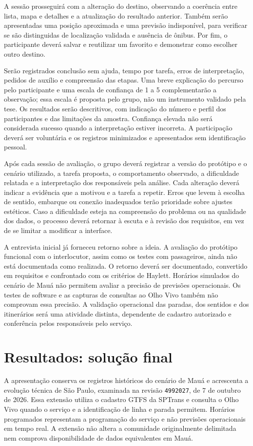 \documentclass[12pt,oneside,a4paper,brazil,chapter=TITLE]{abntex2}
\begin{document}
A sessão prosseguirá com a alteração do destino, observando a coerência entre lista, mapa e detalhes e a atualização do resultado anterior. Também serão apresentadas uma posição aproximada e uma previsão indisponível, para verificar se são distinguidas de localização validada e ausência de ônibus. Por fim, o participante deverá salvar e reutilizar um favorito e demonstrar como escolher outro destino.

Serão registrados conclusão sem ajuda, tempo por tarefa, erros de interpretação, pedidos de auxílio e compreensão das etapas. Uma breve explicação do percurso pelo participante e uma escala de confiança de 1 a 5 complementarão a observação; essa escala é proposta pelo grupo, não um instrumento validado pela tese. Os resultados serão descritivos, com indicação do número e perfil dos participantes e das limitações da amostra. Confiança elevada não será considerada sucesso quando a interpretação estiver incorreta. A participação deverá ser voluntária e os registros minimizados e apresentados sem identificação pessoal.

Após cada sessão de avaliação, o grupo deverá registrar a versão do protótipo e o cenário utilizado, a tarefa proposta, o comportamento observado, a dificuldade relatada e a interpretação dos responsáveis pela análise. Cada alteração deverá indicar a evidência que a motivou e a tarefa a repetir. Erros que levem à escolha de sentido, embarque ou conexão inadequados terão prioridade sobre ajustes estéticos. Caso a dificuldade esteja na compreensão do problema ou na qualidade dos dados, o processo deverá retornar à escuta e à revisão dos requisitos, em vez de se limitar a modificar a interface.

A entrevista inicial já forneceu retorno sobre a ideia. A avaliação do protótipo funcional com o interlocutor, assim como os testes com passageiros, ainda não está documentada como realizada. O retorno deverá ser documentado, convertido em requisitos e confrontado com os critérios de Haylett. Horários simulados do cenário de Mauá não permitem avaliar a precisão de previsões operacionais. Os testes de software e as capturas de consultas ao Olho Vivo também não comprovam essa precisão. A validação operacional das paradas, dos sentidos e dos itinerários será uma atividade distinta, dependente de cadastro autorizado e conferência pelos responsáveis pelo serviço.

\chapter{Resultados: solução final}

A apresentação conserva os registros históricos do cenário de Mauá e acrescenta a evolução técnica de São Paulo, examinada na revisão \texttt{4992027}, de 7 de outubro de 2026. Essa extensão utiliza o cadastro GTFS da SPTrans e consulta o Olho Vivo quando o serviço e a identificação de linha e parada permitem. Horários programados representam a programação do serviço e não previsões operacionais em tempo real. A extensão não altera a comunidade originalmente delimitada nem comprova disponibilidade de dados equivalentes em Mauá.
\end{document}
